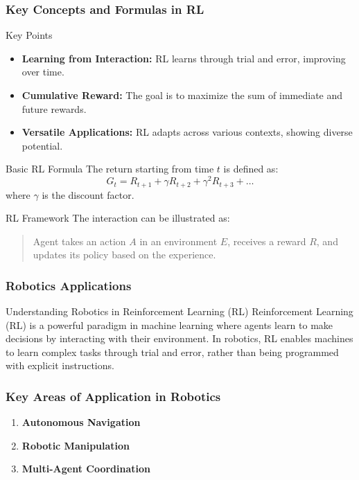 \documentclass[aspectratio=169]{beamer}
\begin{document}
\begin{frame}[fragile]
    \frametitle{Key Concepts and Formulas in RL}
    
    \begin{block}{Key Points}
        \begin{itemize}
            \item \textbf{Learning from Interaction:} RL learns through trial and error, improving over time.
            \item \textbf{Cumulative Reward:} The goal is to maximize the sum of immediate and future rewards.
            \item \textbf{Versatile Applications:} RL adapts across various contexts, showing diverse potential.
        \end{itemize}
    \end{block}
    
    \begin{block}{Basic RL Formula}
        The return starting from time \( t \) is defined as:
        \begin{equation}
            G_t = R_{t+1} + \gamma R_{t+2} + \gamma^2 R_{t+3} + \ldots
        \end{equation}
        where \( \gamma \) is the discount factor.
    \end{block}
    
    \begin{block}{RL Framework}
        The interaction can be illustrated as:
        \begin{quote}
            Agent takes an action \( A \) in an environment \( E \), receives a reward \( R \), and updates its policy based on the experience.
        \end{quote}
    \end{block}
\end{frame}

\begin{frame}[fragile]
    \frametitle{Robotics Applications}
    \begin{block}{Understanding Robotics in Reinforcement Learning (RL)}
        Reinforcement Learning (RL) is a powerful paradigm in machine learning where agents learn to make decisions by interacting with their environment. In robotics, RL enables machines to learn complex tasks through trial and error, rather than being programmed with explicit instructions.
    \end{block}
\end{frame}

\begin{frame}[fragile]
    \frametitle{Key Areas of Application in Robotics}
    \begin{enumerate}
        \item \textbf{Autonomous Navigation}
        \item \textbf{Robotic Manipulation}
        \item \textbf{Multi-Agent Coordination}
    \end{enumerate}
\end{frame}
\end{document}

